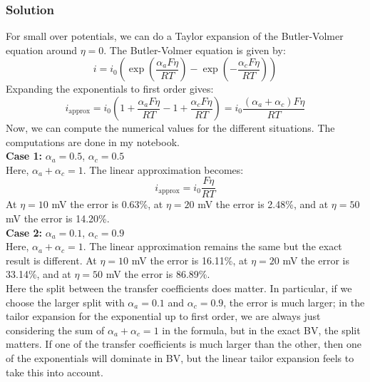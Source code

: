 \documentclass[12pt]{article}
\begin{document}
\subsubsection{Solution}
For small over potentials, we can do a Taylor expansion of the Butler-Volmer equation around $\eta = 0$. The Butler-Volmer equation is given by:
\begin{equation}
i = i_0 \left( \exp \left( \frac{\alpha_a F \eta}{RT} \right) - \exp \left( -\frac{\alpha_c F \eta}{RT} \right) \right)
\end{equation}
Expanding the exponentials to first order gives:
\begin{equation}
i_\text{approx} = i_0 \left( 1 + \frac{\alpha_a F \eta}{RT} - 1 + \frac{\alpha_c F \eta}{RT} \right) = i_0 \frac{(\alpha_a + \alpha_c) F \eta}{RT}
\end{equation}
Now, we can compute the numerical values for the different situations. The computations are done in my notebook.\\
\textbf{Case 1:} $\alpha_a = 0.5$, $\alpha_c = 0.5$\\
Here, $\alpha_a + \alpha_c = 1$. The linear approximation becomes:
\begin{equation}
i_\text{approx} = i_0 \frac{F \eta}{RT}
\end{equation}
At $\eta = 10$ mV the error is 0.63\%, at $\eta = 20$ mV the error is 2.48\%, and at $\eta = 50$ mV the error is 14.20\%.\\
\textbf{Case 2:} $\alpha_a = 0.1$, $\alpha_c = 0.9$\\
Here, $\alpha_a + \alpha_c = 1$. The linear approximation remains the same but the exact result is different. At $\eta = 10$ mV the error is 16.11\%, at $\eta = 20$ mV the error is 33.14\%, and at $\eta = 50$ mV the error is 86.89\%.\\
Here the split between the transfer coefficients does matter. In particular, if we choose the larger split with $\alpha_a = 0.1$ and $\alpha_c = 0.9$, the error is much larger; in the tailor expansion for the exponential up to first order, we are always just considering the sum of $\alpha_a + \alpha_c = 1$ in the formula, but in the exact BV, the split matters. If one of the transfer coefficients is much larger than the other, then one of the exponentials will dominate in BV, but the linear tailor expansion feels to take this into account.
\end{document}
